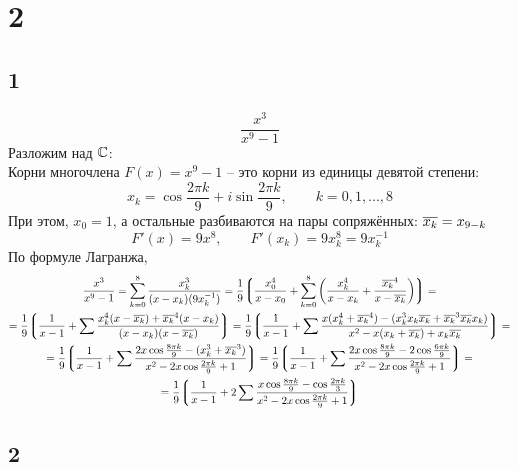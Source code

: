 \section{2}

\subsection{1}

$$ \frac{x^3}{x^9 - 1} $$
Разложим над $ \mathbb{C} $: \\
Корни многочлена $ F(x) = x^9 - 1 $ -- это корни из единицы девятой степени:
$$ x_k = \cos\frac{2\pi k}9 + i \sin\frac{2\pi k}9, \qquad k = 0, 1, ..., 8 $$
При этом, $ x_0 = 1 $, а остальные разбиваются на пары сопряжённых: $ \overline{x_k} = x_{9 - k} $
$$ F'(x) = 9x^8, \qquad F'(x_k) = 9x_k^8 = 9x_k^{-1} $$
По формуле Лагранжа,
\begin{multline*}
    \frac{x^3}{x^9 - 1} = \sum_{k = 0}^8 \frac{x_k^3}{(x - x_k)(9x_k^{-1})} = \frac19 \bigg\lgroup \frac{x_0^4}{x - x_0} + \sum_{k = 0}^8 \bigg( \frac{x_k^4}{x - x_k} + \frac{\overline{x_k}^4}{x - \overline{x_k}} \bigg) \bigg\rgroup = \\
    = \frac19 \bigg\lgroup \frac1{x - 1} + \sum \frac{x_k^4(x - \overline{x_k}) + \overline{x_k}^4(x - x_k)}{(x - x_k)(x - \overline{x_k})} \bigg\rgroup = \frac19 \bigg\lgroup \frac1{x - 1} + \sum \frac{x(x_k^4 + \overline{x_k}^4) - (x_k^3x_k\overline{x_k} + \overline{x_k}^3\overline{x_k}x_k)}{x^2 - x(x_k + \overline{x_k}) + x_k\overline{x_k}} \bigg\rgroup = \\
    = \frac19 \bigg\lgroup \frac1{x - 1} + \sum \frac{2x\cos\frac{8\pi k}9 - (x_k^3 + \overline{x_k}^3)}{x^2 - 2x\cos\frac{2\pi k}9 + 1} \bigg\rgroup = \frac19 \bigg\lgroup \frac1{x - 1} + \sum \frac{2x\cos\frac{8\pi k}9 - 2\cos\frac{6\pi k}9}{x^2 - 2x\cos\frac{2\pi k}9 + 1} \bigg\rgroup = \\
    = \frac19 \bigg\lgroup \frac1{x - 1} + 2\sum \frac{x\cos\frac{8\pi k}9 - \cos\frac{2\pi k}3}{x^2 - 2x\cos\frac{2\pi k}9 + 1} \bigg\rgroup
\end{multline*}

\subsection{2}

